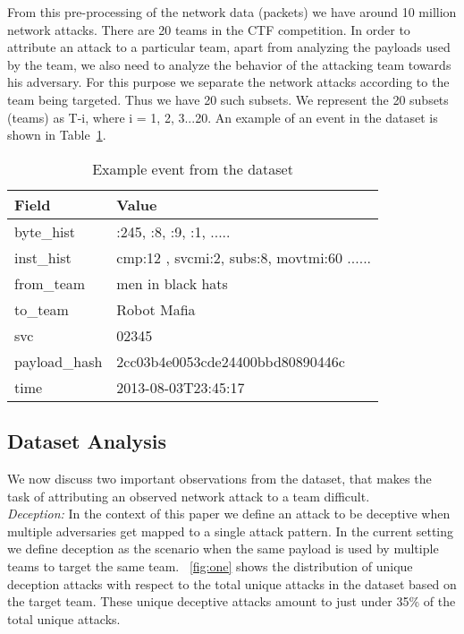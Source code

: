 \documentclass[conference]{IEEEtran}
\begin{document}
From this pre-processing of the network data (packets) we have around 10 million network attacks. There are 20 teams in the CTF competition. In order to attribute an attack to a particular team, apart from analyzing the payloads used by the team, we also need to analyze the behavior of the attacking team towards his adversary. For this purpose we separate the network attacks according to the team being targeted. Thus we have 20 such subsets. We represent the 20 subsets (teams) as T-i, where i = 1, 2, 3...20. An example of an event in the dataset is shown in Table~\ref{event}.
\vspace{-1em}
\begin{table}[h!]
	\caption{\textmd{Example event from the dataset}}
	\label{event}
	\tiny
	\centering
	\renewcommand{\arraystretch}{1.5}
	
	\begin{tabular}{|p{2.3cm}|p{4cm}|} 
		\hline
		{\bf Field} &  {\bf Value} \\ \hline 
		
		\textsf{byte\_hist} & :245, :8, :9, :1, .....\\ \hline
		\textsf{inst\_hist} & cmp:12 , svcmi:2, subs:8, movtmi:60 ......\\ \hline
		\textsf{from\_team} &  men in black hats\\ \hline
		\textsf{to\_team} & Robot Mafia\\ \hline
		\textsf{svc} & 02345\\ \hline
		\textsf{payload\_hash} & 2cc03b4e0053cde24400bbd80890446c\\ \hline
		\textsf{time} & 2013-08-03T23:45:17\\
		\hline
	\end{tabular}
	\vspace{-1em}
	
\end{table}

\subsection{Dataset Analysis}
We now discuss two important observations from the dataset, that makes the task of attributing an observed network attack to a team difficult.\smallskip \\
\noindent\textit{Deception:}
In the context of this paper we define an attack to be deceptive when multiple adversaries get mapped to a single attack pattern. In the current setting we define deception as the scenario when the same payload is used by multiple teams to target the same team. \figurename~\ref{fig:one} shows the distribution of unique deception attacks with respect to the total unique attacks in the dataset based on the target team. These unique deceptive attacks amount to just under 35\% of the total unique attacks. 
\end{document}
